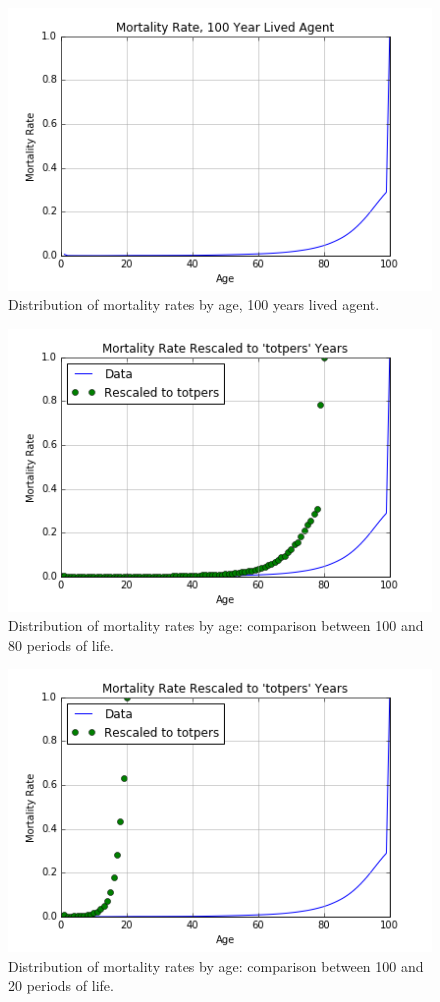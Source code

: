 \documentclass[letterpaper,12pt]{article}
\theoremstyle{definition}
\begin{document}
\begin{figure}[h!]
\centering
\includegraphics[scale=.8]{code/images/mort_totpers100}
\caption{Distribution of mortality rates by age, 100 years lived agent.}
\end{figure}

\begin{figure}[h!]
\centering
\includegraphics[scale=.8]{code/images/mort_totpers80}
\caption{Distribution of mortality rates by age: comparison between 100 and 80 periods of life.}
\end{figure}

\begin{figure}[h!]
\centering
\includegraphics[scale=.8]{code/images/mort_totpers20}
\caption{Distribution of mortality rates by age: comparison between 100 and 20 periods of life.}
\end{figure}
\end{document}
